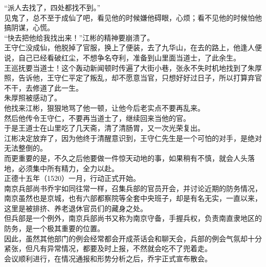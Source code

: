 \begin{multicols}{\theparacolNo}
“派人去找了，四处都找不到。”\\

见鬼了，总不至于成仙了吧，看见他的时候嫌他碍眼，心烦；看不见他的时候怕他搞阴谋，心慌。\\

“快去把他给我找出来！”江彬的精神要崩溃了。\\

王守仁没成仙，他脱掉了官服，换上了便装，去了九华山，在去的路上，他逢人便说，自己已经看破红尘，不想争名夺利，准备到山里面当道士，了此余生。\\

王巡抚要当道士！这个轰动新闻顿时传遍了大街小巷，张永不失时机地找到了朱厚照，告诉他，王守仁平定了叛乱，却不愿意当官，只想好好过日子，所以打算弃官不干，去修道了此一生。\\

朱厚照被感动了。\\

他找来江彬，狠狠地骂了他一顿，让他今后老实点不要再乱来。\\

然后他传令王守仁，不要再当道士了，继续回来当他的官。\\

于是王道士在山里吃了几天斋，清了清肠胃，又一次光荣复出。\\

江彬决定放弃了，因为他终于清醒意识到，王守仁先生是一个可怕的对手，是绝对无法整倒的。\\

而更重要的是，不久之后他要做一件惊天动地的事，如果稍有不慎，就会人头落地，必须集中所有精力，全力以赴。\\

正德十五年（1520）一月，行动正式开始。\\

南京兵部尚书乔宇如同往常一样，召集兵部的官员开会，并讨论近期的防务情况，南京虽然也是京城，也有六部都察院等全套中央班子，却是有名无实，一直以来，这里是被排挤、养老退休官员们的藏身之处。\\

但兵部是一个例外，南京兵部尚书又称为南京守备，手握兵权，负责南直隶地区的防务，是一个极其重要的位置。\\

因此，虽然其他部门的例会经常都会开成茶话会和聊天会，兵部的例会气氛却十分紧张，但凡有异常情况，都要及时上报，不然就会吃不了兜着走。\\

会议顺利进行，在情况通报和形势分析之后，乔宇正式宣布散会。\\


\end{multicols}
